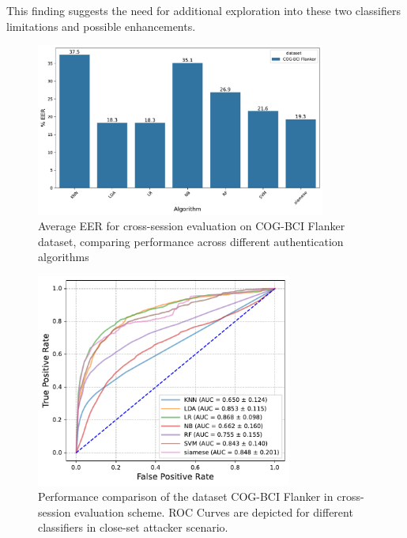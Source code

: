This finding suggests the need for additional exploration into these two classifiers limitations and possible enhancements. 
\begin{figure}
    \centering
     \includegraphics[width=0.85\textwidth]{figures/Results/Cross_Session/EER/EER_plot_close_Set.pdf}  
    
    \caption{Average EER for cross-session evaluation on COG-BCI Flanker dataset, comparing performance across different authentication algorithms}
    \label{fig: Cross_session_EER_Close_set}
\end{figure}

\begin{figure}
    \centering
     \includegraphics[width=0.75\textwidth]{figures/Results/Cross_Session/ROC_CURVE/ROC_Curve_Close_set_cross_session.pdf}  
    
    \caption{Performance comparison of the dataset COG-BCI Flanker in cross-session evaluation scheme. ROC Curves are depicted for different classifiers in close-set attacker scenario.}
    \label{fig: Cross_session_ROC_Close_set}
\end{figure}

